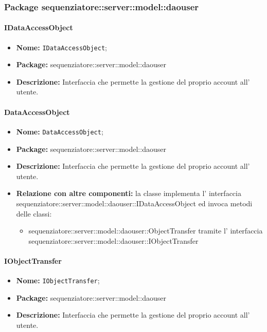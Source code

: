 \subsubsection{Package sequenziatore::server::model::daouser}
\paragraph{IDataAccessObject}
	\begin{itemize}
		\item \textbf{Nome:} \texttt{IDataAccessObject};
		\item \textbf{Package:} sequenziatore::server::model::daouser
		\item \textbf{Descrizione:} Interfaccia che permette la gestione del proprio account all' utente.
	\end{itemize}
\paragraph{DataAccessObject}
	\begin{itemize}
		\item \textbf{Nome:} \texttt{DataAccessObject};
		\item \textbf{Package:} sequenziatore::server::model::daouser
		\item \textbf{Descrizione:} Interfaccia che permette la gestione del proprio account all' utente.
		\item \textbf{Relazione con altre componenti:} la classe implementa l' interfaccia sequenziatore::server::model::daouser::IDataAccessObject ed invoca metodi delle classi:
		\begin{itemize}
			\item sequenziatore::server::model::daouser::ObjectTransfer tramite l' interfaccia sequenziatore::server::model::daouser::IObjectTransfer
		\end{itemize}
	\end{itemize}
\paragraph{IObjectTransfer}
	\begin{itemize}
		\item \textbf{Nome:} \texttt{IObjectTransfer};
		\item \textbf{Package:} sequenziatore::server::model::daouser
		\item \textbf{Descrizione:} Interfaccia che permette la gestione del proprio account all' utente.
	\end{itemize}
